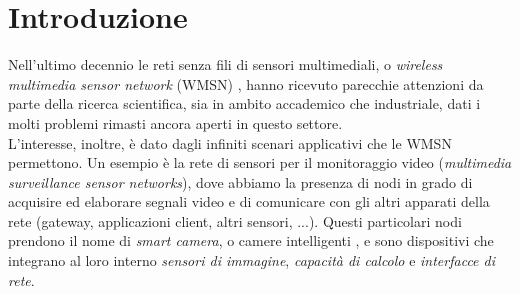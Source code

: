 \chapter{Introduzione}
\label{Introduzione}
\thispagestyle{empty}

Nell'ultimo decennio le reti senza fili di sensori multimediali, o \textit{wireless multimedia sensor network} (WMSN) \cite{akyildiz2007survey}, hanno ricevuto parecchie attenzioni da parte della ricerca scientifica, sia in ambito accademico che industriale, dati i molti problemi rimasti ancora aperti in questo settore.\\
L'interesse, inoltre, \`e dato dagli infiniti scenari applicativi che le WMSN permettono.
Un esempio \`e la rete di sensori per il monitoraggio video (\textit{multimedia surveillance sensor networks}), dove abbiamo la presenza di nodi in grado di acquisire ed elaborare segnali video e di comunicare con gli altri apparati della rete (gateway, applicazioni client, altri sensori, ...).
Questi particolari nodi prendono il nome di \textit{smart camera}, o camere intelligenti \cite{wolf2002smart}, e sono dispositivi che integrano al loro interno \textit{sensori di immagine}, \textit{capacit\`a di calcolo} e \textit{interfacce di rete}.
